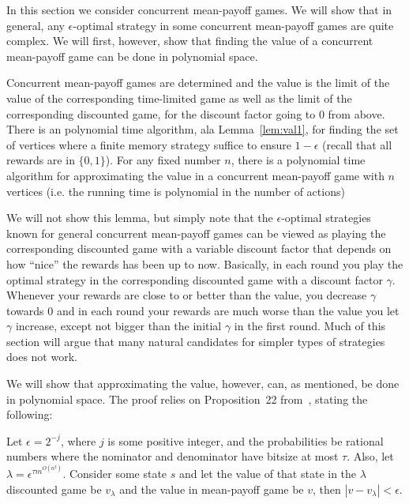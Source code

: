 In this section we consider concurrent mean-payoff games. 
We will show that in general, any  $\epsilon$-optimal strategy in some concurrent mean-payoff games are quite complex. 
We will first, however, show that finding the value of a concurrent mean-payoff game can be done in polynomial space.

\begin{lemma}\label{lemm:class_meanpayoff}
Concurrent mean-payoff games are determined and the value is the limit of the value of the corresponding time-limited game as well as the limit of the corresponding discounted game, for the discount factor going to 0 from above.
There is an polynomial time algorithm, ala Lemma~\cref{lem:val1}, for finding the set of vertices where a finite memory strategy suffice to ensure $1-\epsilon$ (recall that all rewards are in $\{0,1\}$).
For any fixed number $n$, there is a polynomial time algorithm for approximating the value in a concurrent mean-payoff game with $n$ vertices (i.e. the running time is polynomial in the number of actions)
\end{lemma}
We will not show this lemma, but simply note that the $\epsilon$-optimal strategies known for general concurrent mean-payoff games  can be viewed as playing the corresponding discounted game with a variable discount factor that depends on how ``nice'' the rewards has been up to now. Basically, in each round you play the optimal strategy in the corresponding discounted game with a discount factor $\gamma$. Whenever 
 your rewards are close to or better than the value, you decrease $\gamma$ towards 0 and in each round your rewards are much worse than the value you let $\gamma$ increase, except not bigger than the initial $\gamma$ in the first round. Much of this section will argue that many natural candidates for simpler types of strategies does not work.


We will show that approximating the value, however, can, as mentioned, be done in polynomial space. The proof relies on Proposition~22 from~\cite{HKLMT:2011}, stating the following:
\begin{proposition}
Let $\epsilon=2^{-j}$, where $j$ is some positive integer, and the probabilities be rational numbers where the nominator and denominator have bitsize at most $\tau$. Also, let $\lambda=\epsilon^{\tau m^{O(n^2)}}$. Consider some state $s$ and let the value of that state in the $\lambda$ discounted game be $v_{\lambda}$ and the value in mean-payoff game be $v$, then $|v-v_{\lambda}|<\epsilon$.
\end{proposition}

